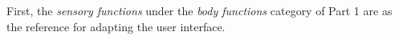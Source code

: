 First, the \textit{sensory 
functions} under the \textit{body functions} category of Part 1 are as the reference for adapting the user interface.


% 
